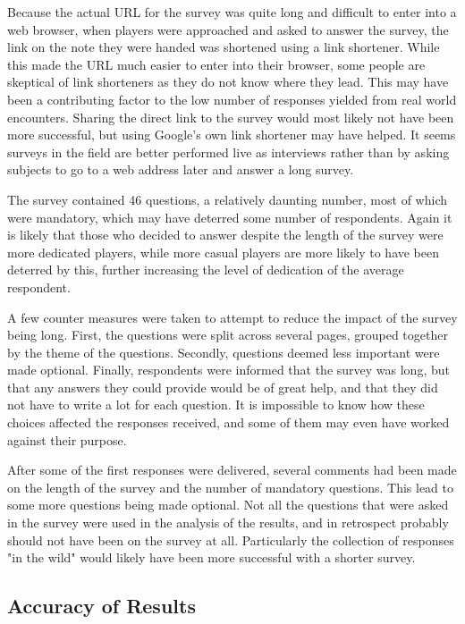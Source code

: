 Because the actual URL for the survey was quite long and difficult to enter into a web browser, when players were approached and asked to answer the survey, the link on the note they were handed was shortened using a link shortener. While this made the URL much easier to enter into their browser, some people are skeptical of link shorteners as they do not know where they lead. This may have been a contributing factor to the low number of responses yielded from real world encounters. Sharing the direct link to the survey would most likely not have been more successful, but using Google's own link shortener may have helped. It seems surveys in the field are better performed live as interviews rather than by asking subjects to go to a web address later and answer a long survey.

The survey contained 46 questions, a relatively daunting number, most of which were mandatory, which may have deterred some number of respondents. Again it is likely that those who decided to answer despite the length of the survey were more dedicated players, while more casual players are more likely to have been deterred by this, further increasing the level of dedication of the average respondent.

A few counter measures were taken to attempt to reduce the impact of the survey being long. First, the questions were split across several pages, grouped together by the theme of the questions. Secondly, questions deemed less important were made optional. Finally, respondents were informed that the survey was long, but that any answers they could provide would be of great help, and that they did not have to write a lot for each question. It is impossible to know how these choices affected the responses received, and some of them may even have worked against their purpose.

After some of the first responses were delivered, several comments had been made on the length of the survey and the number of mandatory questions. This lead to some more questions being made optional. Not all the questions that were asked in the survey were used in the analysis of the results, and in retrospect probably should not have been on the survey at all. Particularly the collection of responses "in the wild" would likely have been more successful with a shorter survey.

\subsection{Accuracy of Results}

